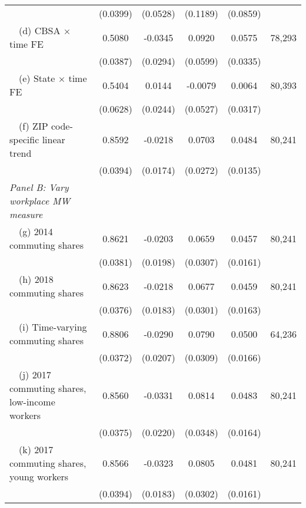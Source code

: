 \begin{landscape}
\begin{table}[ht!]
\begin{tabular}{@{}lccccc@{}}
                                                             & (0.0399) & (0.0528) & (0.1189) & (0.0859) &      \\
        $\quad$(d) CBSA $\times$ time FE                     &  0.5080  &  -0.0345  &  0.0920  &  0.0575  & 78,293 \\
                                                             & (0.0387) & (0.0294) & (0.0599) & (0.0335) &      \\
        $\quad$(e) State $\times$ time FE                    &  0.5404  &  0.0144  &  -0.0079  &  0.0064  & 80,393 \\
                                                             & (0.0628) & (0.0244) & (0.0527) & (0.0317) &      \\
        $\quad$(f) ZIP code-specific linear trend            &  0.8592  &  -0.0218  &  0.0703  &  0.0484  & 80,241 \\
                                                             & (0.0394) & (0.0174) & (0.0272) & (0.0135) &      \\
        \textit{Panel B: Vary workplace MW measure}          &       &       &       &       &      \\
        $\quad$(g) 2014 commuting shares                     &  0.8621  &  -0.0203  &  0.0659  &  0.0457  & 80,241 \\
                                                             & (0.0381) & (0.0198) & (0.0307) & (0.0161) &      \\
        $\quad$(h) 2018 commuting shares                     &  0.8623  &  -0.0218  &  0.0677  &  0.0459  & 80,241 \\
                                                             & (0.0376) & (0.0183) & (0.0301) & (0.0163) &      \\
        $\quad$(i) Time-varying commuting shares             &  0.8806  &  -0.0290  &  0.0790  &  0.0500  & 64,236 \\
                                                             & (0.0372) & (0.0207) & (0.0309) & (0.0166) &      \\
        $\quad$(j) 2017 commuting shares, low-income workers &  0.8560  &  -0.0331  &  0.0814  &  0.0483  & 80,241 \\
                                                             & (0.0375) & (0.0220) & (0.0348) & (0.0164) &      \\
        $\quad$(k) 2017 commuting shares, young workers      &  0.8566  &  -0.0323  &  0.0805  &  0.0481  & 80,241 \\
                                                             & (0.0394) & (0.0183) & (0.0302) & (0.0161) &      \\ \bottomrule
    \end{tabular}


\end{table}
\end{landscape}
